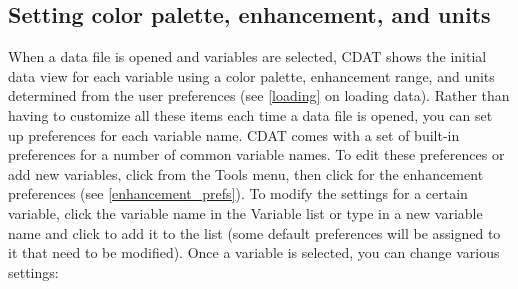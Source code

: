 \subsection{Setting color palette, enhancement, and units}

When a data file is opened and variables are selected, CDAT shows
the initial data view for each variable using a color palette,
enhancement range, and units determined from the user preferences
(see \autoref{loading} on loading data).  Rather than having to
customize all these items each time a data file is opened, you
can set up preferences for each variable name.  CDAT comes with a
set of built-in preferences for a number of common variable
names.  To edit these preferences or add new variables, click
 from the {\gui Tools} menu, then
click  for the enhancement
preferences (see \autoref{enhancement_prefs}).  To modify the
settings for a certain variable, click the variable name in the
{\gui Variable} list or type in a new variable name and click
 to add it to the list (some default preferences
will be assigned to it that need to be modified).  Once a
variable is selected, you can change various settings:
